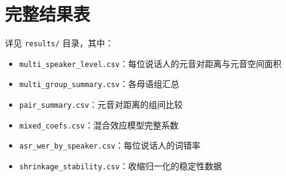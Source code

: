 \documentclass[11pt,a4paper]{ctexart}
\begin{document}
\appendix

\section{完整结果表}

详见 \texttt{results/} 目录，其中：

\begin{itemize}[leftmargin=2em,itemsep=1pt]
  \item \texttt{multi\_speaker\_level.csv}：每位说话人的元音对距离与元音空间面积
  \item \texttt{multi\_group\_summary.csv}：各母语组汇总
  \item \texttt{pair\_summary.csv}：元音对距离的组间比较
  \item \texttt{mixed\_coefs.csv}：混合效应模型完整系数
  \item \texttt{asr\_wer\_by\_speaker.csv}：每位说话人的词错率
  \item \texttt{shrinkage\_stability.csv}：收缩归一化的稳定性数据
\end{itemize}
\end{document}
